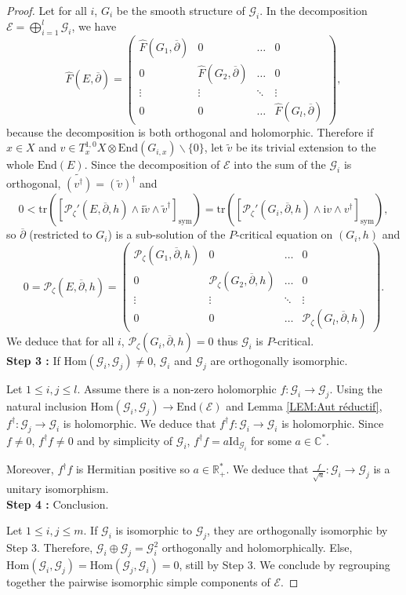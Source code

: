 \documentclass{article}
\theoremstyle{remark}
\theoremstyle{definition}
\newcommand{\R}{\mathbb{R}}
\newcommand{\C}{\mathbb{C}}
\newcommand{\Hom}{\mathrm{Hom}}
\newcommand{\End}{\mathrm{End}}
\newcommand{\tr}{\mathrm{tr}}
\newcommand{\Id}{\mathrm{Id}}
\renewcommand{\i}{\boldsymbol{\mathrm{i}}}
\newcommand{\E}{\mathcal{E}}
\newcommand{\G}{\mathcal{G}}
\newcommand{\mP}{\mathcal{P}}
\newcommand{\dbar}{\overline{\partial}}
\newcommand{\sym}{\mathrm{sym}}
\renewcommand{\leq}{\leqslant}
\begin{document}
\begin{proof}
Let for all $i$, $G_i$ be the smooth structure of $\G_i$. In the decomposition $\E = \bigoplus_{i = 1}^l \G_i$, we have
$$
\hat{F}(E,\dbar) = \begin{pmatrix}
    \hat{F}(G_1,\dbar) & 0 & \hdots & 0\\
    0 & \hat{F}(G_2,\dbar) & \hdots & 0\\
    \vdots & \vdots & \ddots & \vdots \\
    0 & 0 & \hdots & \hat{F}(G_l,\dbar)
\end{pmatrix},
$$
because the decomposition is both orthogonal and holomorphic. Therefore if $x \in X$ and $v \in T_x^{1,0}X \otimes \End(G_{i,x})\backslash\{0\}$, let $\tilde{v}$ be its trivial extension to the whole $\End(E)$. Since the decomposition of $\E$ into the sum of the $\G_i$ is orthogonal, $\widetilde{(v^\dagger)} = (\tilde{v})^\dagger$ and
$$
0 < \tr([\mP_\zeta'(E,\dbar,h) \wedge \i \tilde{v} \wedge \tilde{v}^\dagger]_\sym) = \tr([\mP_\zeta'(G_i,\dbar,h) \wedge \i v \wedge v^\dagger]_\sym),
$$
so $\dbar$ (restricted to $G_i$) is a sub-solution of the $P$-critical equation on $(G_i,h)$ and
$$
0 = \mP_\zeta(E,\dbar,h) = \begin{pmatrix}
    \mP_\zeta(G_1,\dbar,h) & 0 & \hdots & 0\\
    0 & \mP_\zeta(G_2,\dbar,h) & \hdots & 0\\
    \vdots & \vdots & \ddots & \vdots \\
    0 & 0 & \hdots & \mP_\zeta(G_l,\dbar,h)
\end{pmatrix}.
$$
We deduce that for all $i$, $\mP_\zeta(G_i,\dbar,h) = 0$ thus $\G_i$ is $P$-critical.\\

\noindent\textbf{Step 3 :} If $\Hom(\G_i,\G_j) \neq 0$, $\G_i$ and $\G_j$ are orthogonally isomorphic.

Let $1 \leq i,j \leq l$. Assume there is a non-zero holomorphic $f : \G_i \rightarrow \G_j$. Using the natural inclusion $\Hom(\G_i,\G_j) \rightarrow \End(\E)$ and Lemma \ref{LEM:Aut réductif}, $f^\dagger : \G_j \rightarrow \G_i$ is holomorphic. We deduce that $f^\dagger f : \G_i \rightarrow \G_i$ is holomorphic. Since $f \neq 0$, $f^\dagger f \neq 0$ and by simplicity of $\G_i$, $f^\dagger f = a\Id_{\G_i}$ for some $a \in \C^*$.

Moreover, $f^\dagger f$ is Hermitian positive so $a \in \R_+^*$. We deduce that $\frac{f}{\sqrt{a}} : \G_i \rightarrow \G_j$ is a unitary isomorphism.\\

\noindent\textbf{Step 4 :} Conclusion.

Let $1 \leq i,j \leq m$. If $\G_i$ is isomorphic to $\G_j$, they are orthogonally isomorphic by Step 3. Therefore, $\G_i \oplus \G_j = \G_i^2$ orthogonally and holomorphically. Else, $\Hom(\G_i,\G_j) = \Hom(\G_j,\G_i) = 0$, still by Step 3. We conclude by regrouping together the pairwise isomorphic simple components of $\E$.
\end{proof}
\end{document}
